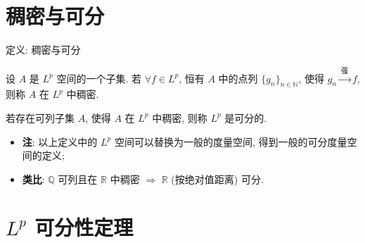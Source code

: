 
\section[稠密与可分]{稠密与可分}


\begin{frame}{定义: 稠密与可分}

\begin{Def}[稠密]
设 $A$ 是 $L^p$ 空间的一个子集. 若 $\forall f \in L^p$, 恒有 $A$ 中的点列
$\{ g_n \}_{n \in \mathbb{N}}$, 使得 $g_n \xrightarrow{\ \text{强}\ } f$,
则称 $A$ 在 $L^p$ 中\alert{稠密}.
\end{Def}

\pause

\begin{Def}[可分]
若存在\alert{可列}子集 $A$, 使得 $A$ 在 $L^p$ 中稠密, 则称 $L^p$ 是\alert{可分的}.
\end{Def}

\pause

\begin{itemize}
\item \textbf{注}: 以上定义中的 $L^p$ 空间可以替换为一般的度量空间,
  得到一般的\alert{可分度量空间}的定义;
\item \textbf{类比}: $\mathbb{Q}$ 可列且在 $\mathbb{R}$ 中稠密
  $\Longrightarrow$ $\mathbb{R}$ (按绝对值距离) 可分.
\end{itemize}

\end{frame}


\section[可分定理]{$L^p$ 可分性定理}


